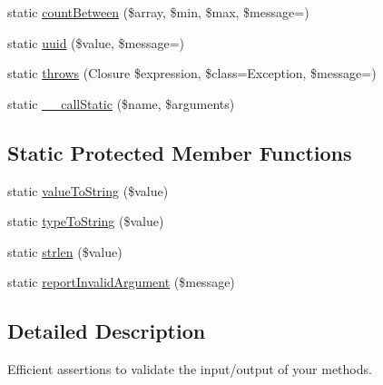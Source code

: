 \begin{DoxyCompactItemize}
static \mbox{\hyperlink{class_webmozart_1_1_assert_1_1_assert_a91b66b1999d1f7b3757c7ad6d98c6174}{count\+Between}} (\$array, \$min, \$max, \$message=\textquotesingle{}\textquotesingle{})
\item 
static \mbox{\hyperlink{class_webmozart_1_1_assert_1_1_assert_af66112ada7ab8b2dc66bf8ee7cba5b3d}{uuid}} (\$value, \$message=\textquotesingle{}\textquotesingle{})
\item 
static \mbox{\hyperlink{class_webmozart_1_1_assert_1_1_assert_adf2d92561da2f474ccea41032b603aae}{throws}} (Closure \$expression, \$class=\textquotesingle{}Exception\textquotesingle{}, \$message=\textquotesingle{}\textquotesingle{})
\item 
static \mbox{\hyperlink{class_webmozart_1_1_assert_1_1_assert_a61a19cb43fb2530a2f880c0d0672c471}{\+\_\+\+\_\+call\+Static}} (\$name, \$arguments)
\end{DoxyCompactItemize}
\subsection*{Static Protected Member Functions}
\begin{DoxyCompactItemize}
\item 
static \mbox{\hyperlink{class_webmozart_1_1_assert_1_1_assert_a8a7747ba787e01fbada1810cb318a4c5}{value\+To\+String}} (\$value)
\item 
static \mbox{\hyperlink{class_webmozart_1_1_assert_1_1_assert_acd533c558a19f08a9a686e05d859c7d9}{type\+To\+String}} (\$value)
\item 
static \mbox{\hyperlink{class_webmozart_1_1_assert_1_1_assert_a26061730d04e50dea783611369152312}{strlen}} (\$value)
\item 
static \mbox{\hyperlink{class_webmozart_1_1_assert_1_1_assert_a9cb8aef78bad8f487b17d52cb84cbae8}{report\+Invalid\+Argument}} (\$message)
\end{DoxyCompactItemize}


\subsection{Detailed Description}
Efficient assertions to validate the input/output of your methods.

